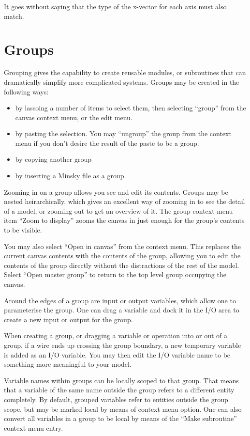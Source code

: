 It goes without saying that the type of the x-vector for each axis
must also match.

\section{Groups}\label{Group}

Grouping gives the capability to create reusable modules, or
subroutines that can dramatically simplify more complicated
systems. Groups may be created in the following ways:
\begin{itemize}
\item by lassoing a number of items to select them, then selecting
  ``group'' from the canvas context menu, or the edit menu.
\item by pasting the selection. You may ``ungroup'' the group from the
  context menu if you don't desire the result of the paste to be a
  group.
\item by copying another group
\item by inserting a Minsky file as a group
\end{itemize}

Zooming in on a group allows you see and edit its contents. Groups may
be nested heirarchically, which gives an excellent way of zooming in
to see the detail of a model, or zooming out to get an overview of
it. The group context menu item ``Zoom to display'' zooms the canvas
in just enough for the group's contents to be visible.

You may also select ``Open in canvas'' from the context menu. This
replaces the current canvas contents with the contents of the group,
allowing you to edit the contents of the group directly without the
distractions of the rest of the model. Select ``Open master group'' to
return to the top level group occupying the canvas.

Around the edges of a group are input or output variables, which allow
one to parameterise the group. One can drag a variable and dock it in
the I/O area to create a new input or output for the group.

When creating a group, or dragging a variable or operation into or out
of a group, if a wire ends up crossing the group boundary, a new
temporary variable is added as an I/O variable. You may then edit the
I/O variable name to be something more meaningful to your model.

Variable names within groups can be locally scoped to that group. That
means that a variable of the same name outside the group refers to a
different entity completely. By default, grouped variables refer to
entities outside the group scope, but may be marked local by means of
context menu option. One can also convert all variables in a group to
be local by means of the ``Make subroutine'' context menu entry.

